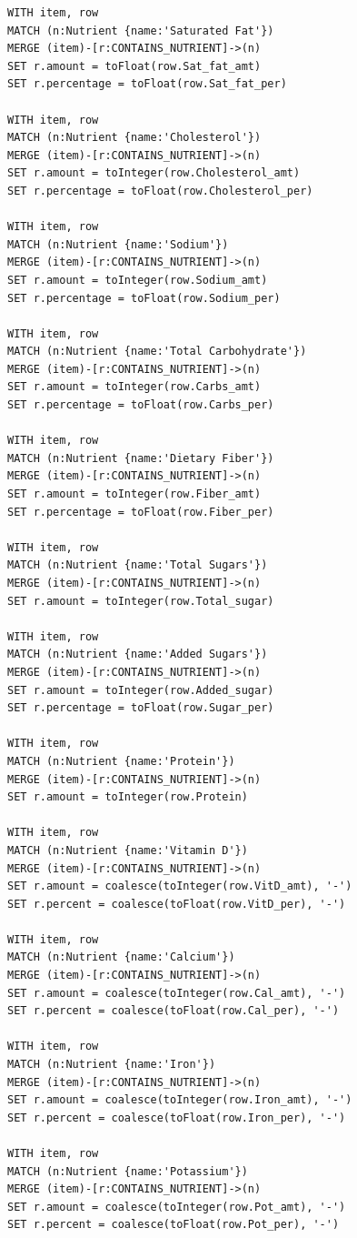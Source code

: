 \documentclass[thesis]{fputhesis}
\begin{document}
\begin{body}
\begin{appendices}
\begin{lstlisting}[language=Cypher]
WITH item, row
MATCH (n:Nutrient {name:'Saturated Fat'})
MERGE (item)-[r:CONTAINS_NUTRIENT]->(n)
SET r.amount = toFloat(row.Sat_fat_amt)
SET r.percentage = toFloat(row.Sat_fat_per)

WITH item, row
MATCH (n:Nutrient {name:'Cholesterol'})
MERGE (item)-[r:CONTAINS_NUTRIENT]->(n)
SET r.amount = toInteger(row.Cholesterol_amt)
SET r.percentage = toFloat(row.Cholesterol_per)

WITH item, row
MATCH (n:Nutrient {name:'Sodium'})
MERGE (item)-[r:CONTAINS_NUTRIENT]->(n)
SET r.amount = toInteger(row.Sodium_amt)
SET r.percentage = toFloat(row.Sodium_per)

WITH item, row
MATCH (n:Nutrient {name:'Total Carbohydrate'})
MERGE (item)-[r:CONTAINS_NUTRIENT]->(n)
SET r.amount = toInteger(row.Carbs_amt)
SET r.percentage = toFloat(row.Carbs_per)

WITH item, row
MATCH (n:Nutrient {name:'Dietary Fiber'})
MERGE (item)-[r:CONTAINS_NUTRIENT]->(n)
SET r.amount = toInteger(row.Fiber_amt)
SET r.percentage = toFloat(row.Fiber_per)

WITH item, row
MATCH (n:Nutrient {name:'Total Sugars'})
MERGE (item)-[r:CONTAINS_NUTRIENT]->(n)
SET r.amount = toInteger(row.Total_sugar)

WITH item, row
MATCH (n:Nutrient {name:'Added Sugars'})
MERGE (item)-[r:CONTAINS_NUTRIENT]->(n)
SET r.amount = toInteger(row.Added_sugar)
SET r.percentage = toFloat(row.Sugar_per)

WITH item, row
MATCH (n:Nutrient {name:'Protein'})
MERGE (item)-[r:CONTAINS_NUTRIENT]->(n)
SET r.amount = toInteger(row.Protein)

WITH item, row
MATCH (n:Nutrient {name:'Vitamin D'})
MERGE (item)-[r:CONTAINS_NUTRIENT]->(n)
SET r.amount = coalesce(toInteger(row.VitD_amt), '-')
SET r.percent = coalesce(toFloat(row.VitD_per), '-')

WITH item, row
MATCH (n:Nutrient {name:'Calcium'})
MERGE (item)-[r:CONTAINS_NUTRIENT]->(n)
SET r.amount = coalesce(toInteger(row.Cal_amt), '-')
SET r.percent = coalesce(toFloat(row.Cal_per), '-')

WITH item, row
MATCH (n:Nutrient {name:'Iron'})
MERGE (item)-[r:CONTAINS_NUTRIENT]->(n)
SET r.amount = coalesce(toInteger(row.Iron_amt), '-')
SET r.percent = coalesce(toFloat(row.Iron_per), '-')

WITH item, row
MATCH (n:Nutrient {name:'Potassium'})
MERGE (item)-[r:CONTAINS_NUTRIENT]->(n)
SET r.amount = coalesce(toInteger(row.Pot_amt), '-')
SET r.percent = coalesce(toFloat(row.Pot_per), '-')


\end{lstlisting}
\end{appendices}
\end{body}
\end{document}
